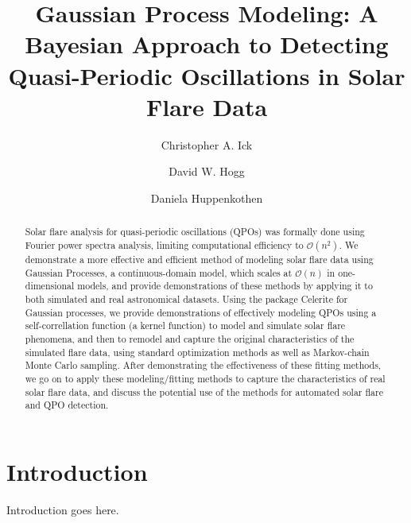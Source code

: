 \documentclass{aastex61}
\begin{document}
\title{Gaussian Process Modeling: A Bayesian Approach to Detecting Quasi-Periodic Oscillations in Solar Flare Data} \label{sec:title and authors}

\author{Christopher A. Ick}

\author{David W. Hogg}

\author{Daniela Huppenkothen}

\begin{abstract} \label{sec:abstract} 
	Solar flare analysis for quasi-periodic oscillations (QPOs)  was formally done using Fourier power spectra analysis, limiting computational efficiency to $\mathcal{O}(n^2)$.
We demonstrate a more effective and efficient method of modeling solar flare data using Gaussian Processes, a continuous-domain model, which scales at $\mathcal{O}(n)$ in one-dimensional models, and provide demonstrations of these methods by applying it to both simulated and real astronomical datasets.
Using the package Celerite for Gaussian processes, we provide demonstrations of effectively modeling QPOs using a self-correllation function (a kernel function) to model and simulate solar flare phenomena, and then to remodel and capture the original characteristics of the simulated flare data, using standard optimization methods as well as Markov-chain Monte Carlo sampling.
After demonstrating the effectiveness of these fitting methods, we go on to apply these modeling/fitting methods to capture the characteristics of real solar flare data, and discuss the potential use of the methods for automated solar flare and QPO detection.
\end{abstract}


\section{Introduction} \label{sec:intro}
Introduction goes here.
\end{document}
